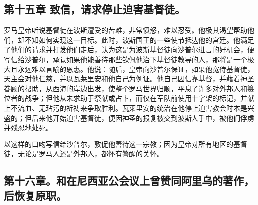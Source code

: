 
\subsection{第十五章 致信，请求停止迫害基督徒。}

罗马皇帝听说基督徒在波斯遭受的苦难，非常愤怒，难以忍受。他极其渴望帮助他们，却不知如何实现这一目标。此时，波斯国王的一些使节抵达他的宫廷。他满足了他们的请求并打发他们走后，认为这是为波斯基督徒向沙普尔进言的好机会，便写信给沙普尔，承认如果他能善待那些钦佩他治下基督徒教导的人，那将是一个极大且永远难以言喻的恩惠。他说：随后，皇帝向沙普尔保证，如果他宽待基督徒，天主会对他仁慈，并以瓦莱里安和他自己为例证。他自己因信靠基督，并藉着神圣眷顾的帮助，从西海的岸边出发，使整个罗马世界归顺，平息了许多对外邦人和篡位者的战争；但他从未求助于祭献或占卜，而仅在军队前使用十字架的标记，并献上不流血、无玷污的祈祷来争取胜利。瓦莱里安的统治在他停止迫害教会时本是兴盛的；但后来他开始迫害基督徒，便因神圣的报复被交到波斯人手中，被他们俘虏并残忍地处死。\par

以这样的口吻写信给沙普尔，敦促他善待这一宗教；因为皇帝对所有地区的基督徒，无论是罗马人还是外邦人，都怀有警醒的关怀。\par


\subsection{第十六章。和在尼西亚公会议上曾赞同阿里乌的著作，后恢复原职。}

